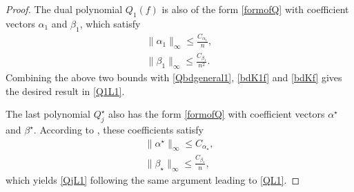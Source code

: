 \begin{proof}
The dual polynomial $Q_1(f)$ is also of the form \eqref{formofQ} with coefficient vectors $\alpha_1$ and $\beta_1$, which satisfy \cite[Proof of Lemma 2.7]{cg_noisy}
\begin{align*}
\|\alpha_1\|_\infty \leq \frac{C_{\alpha_1}}{n},\\
\|\beta_1\|_\infty \leq \frac{C_{\beta_1}}{n^2}.
\end{align*}
Combining the above two bounds with \eqref{Qbdgeneral1}, \eqref{bdK1f} and \eqref{bdKf} gives the desired result in \eqref{Q1L1}.

The last polynomial $Q_j^\star$ also has the form \eqref{formofQ} with coefficient vectors $\alpha^\star$ and $\beta^\star$. According to \cite[Proof of Lemma 2.2]{granda2}, these coefficients satisfy
\begin{align*}
\|\alpha^\star\|_\infty \leq {C_{\alpha_\star}},\\
\|\beta_\star\|_\infty \leq \frac{C_{\beta_\star}}{n},
\end{align*}
which yields \eqref{QjL1} following the same argument leading to \eqref{QL1}. 

\end{proof}


